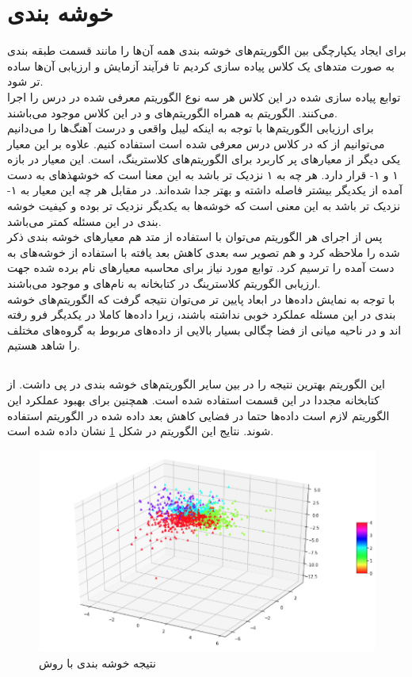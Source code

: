 \section{خوشه بندی}
برای ایجاد یکپارچگی بین الگوریتم‌های خوشه بندی همه آن‌ها را مانند قسمت طبقه بندی به صورت متدهای یک کلاس پیاده سازی کردیم تا فرآیند آزمایش و ارزیابی آن‌ها ساده تر شود.
\\
توابع پیاده سازی شده در این کلاس هر سه نوع الگوریتم معرفی شده در درس را اجرا می‌کنند. الگوریتم  به همراه الگوریتم‌های و  در این کلاس موجود می‌باشند.
\\
برای ارزیابی الگوریتم‌ها با توجه به اینکه لیبل واقعی و درست آهنگ‌ها را می‌دانیم می‌توانیم از  که در کلاس درس معرفی شده است استفاده کنیم. علاوه بر این معیار یکی دیگر از معیارهای پر کاربرد برای الگوریتم‌های کلاسترینگ،  است. این معیار در بازه ۱ و ۱- قرار دارد. هر چه به ۱ نزدیک تر باشد به این معنا است که خوشهذهای به دست آمده از یکدیگر بیشتر فاصله داشته و بهتر جدا شده‌اند. در مقابل هر چه این معیار به ۱- نزدیک تر باشد به این معنی است که خوشه‌ها به یکدیگر نزدیک تر بوده و کیفیت خوشه بندی در این مسئله کمتر می‌باشد.
\\
پس از اجرای هر الگوریتم می‌توان با استفاده از متد  هم معیارهای خوشه بندی ذکر شده را ملاحظه کرد و هم تصویر سه بعدی کاهش بعد یافته با استفاده از  خوشه‌های به دست آمده را ترسیم کرد. توابع مورد نیاز برای محاسبه معیارهای نام برده شده جهت ارزیابی الگوریتم کلاسترینگ در کتابخانه  به نام‌های  و  موجود می‌باشند.
\\
با توجه به نمایش داده‌ها در ابعاد پایین تر می‌توان نتیجه گرفت که الگوریتم‌های خوشه بندی در این مسئله عملکرد خوبی نداشته باشند، زیرا داده‌ها کاملا در یکدیگر فرو رفته اند و در ناحیه میانی از فضا چگالی بسیار بالایی از داده‌های مربوط به گروه‌های مختلف را شاهد هستیم.

\subsection{}
این الگوریتم بهترین نتیجه را در بین سایر الگوریتم‌های خوشه بندی در پی داشت. از کتابخانه  مجددا در این قسمت استفاده شده است. همچنین برای بهبود عملکرد این الگوریتم لازم است داده‌ها حتما در فضایی کاهش بعد داده شده در الگوریتم استفاده شوند. نتایج این الگوریتم در شکل \ref{fig:kmeans} نشان داده شده است.

\begin{figure}[h!]
    \centering
    \includegraphics[width=0.65\linewidth]{images/kmeans1.png}
    \caption{نتیجه خوشه بندی با روش }
    \label{fig:kmeans}
\end{figure}

